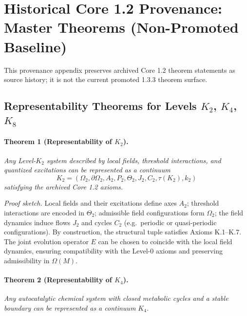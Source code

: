 \section{Historical Core 1.2 Provenance: Master Theorems (Non-Promoted Baseline)}
\label{sec:theorems-master}

This provenance appendix preserves archived Core 1.2 theorem statements as source history; it is not the current promoted 1.3.3 theorem surface.

\subsection{Representability Theorems for Levels \texorpdfstring{\(K_2\)}{K_2}, \texorpdfstring{\(K_4\)}{K_4}, \texorpdfstring{\(K_8\)}{K_8}}

\paragraph{Theorem 1 (Representability of \texorpdfstring{\(K_2\)}{K_2}).}
\emph{Any Level-\(K_2\) system described by local fields, threshold interactions, and quantized excitations can be represented as a continuum}
\[
  K_2=(\Omega_2,\partial\Omega_2,A_2,P_2,\Theta_2,J_2,C_2,\tau(K_2),k_2)
\]
\emph{satisfying the archived Core 1.2 axioms.}

\emph{Proof sketch.}
Local fields and their excitations define axes \(A_2\); threshold interactions are encoded in \(\Theta_2\); admissible field configurations form \(\Omega_2\); the field dynamics induce flows \(J_2\) and cycles \(C_2\) (e.g.\ periodic or quasi-periodic configurations).
By construction, the structural tuple satisfies Axioms K.1–K.7.
The joint evolution operator \(E\) can be chosen to coincide with the local field dynamics, ensuring compatibility with the Level-0 axioms and preserving admissibility in \(\Omega(M)\).

\paragraph{Theorem 2 (Representability of \texorpdfstring{\(K_4\)}{K_4}).}
\emph{Any autocatalytic chemical system with closed metabolic cycles and a stable boundary can be represented as a continuum \(K_4\).}

